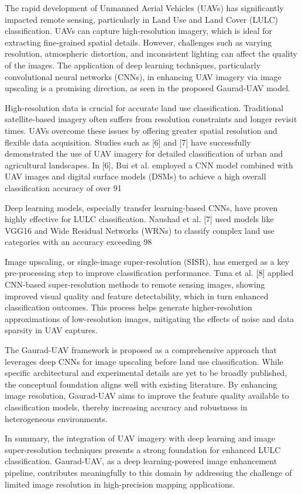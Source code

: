 The rapid development of Unmanned Aerial Vehicles (UAVs) has significantly impacted remote sensing, particularly in Land Use and Land Cover (LULC) classification. UAVs can capture high-resolution imagery, which is ideal for extracting fine-grained spatial details. However, challenges such as varying resolution, atmospheric distortion, and inconsistent lighting can affect the quality of the images. The application of deep learning techniques, particularly convolutional neural networks (CNNs), in enhancing UAV imagery via image upscaling is a promising direction, as seen in the proposed Gaurad-UAV model.

High-resolution data is crucial for accurate land use classification. Traditional satellite-based imagery often suffers from resolution constraints and longer revisit times. UAVs overcome these issues by offering greater spatial resolution and flexible data acquisition. Studies such as [6] and [7] have successfully demonstrated the use of UAV imagery for detailed classification of urban and agricultural landscapes. In [6], Bui et al. employed a CNN model combined with UAV images and digital surface models (DSMs) to achieve a high overall classification accuracy of over 91%

Deep learning models, especially transfer learning-based CNNs, have proven highly effective for LULC classification. Naushad et al. [7] used models like VGG16 and Wide Residual Networks (WRNs) to classify complex land use categories with an accuracy exceeding 98%

Image upscaling, or single-image super-resolution (SISR), has emerged as a key pre-processing step to improve classification performance. Tuna et al. [8] applied CNN-based super-resolution methods to remote sensing images, showing improved visual quality and feature detectability, which in turn enhanced classification outcomes. This process helps generate higher-resolution approximations of low-resolution images, mitigating the effects of noise and data sparsity in UAV captures.

The Gaurad-UAV framework is proposed as a comprehensive approach that leverages deep CNNs for image upscaling before land use classification. While specific architectural and experimental details are yet to be broadly published, the conceptual foundation aligns well with existing literature. By enhancing image resolution, Gaurad-UAV aims to improve the feature quality available to classification models, thereby increasing accuracy and robustness in heterogeneous environments.

In summary, the integration of UAV imagery with deep learning and image super-resolution techniques presents a strong foundation for enhanced LULC classification. Gaurad-UAV, as a deep learning-powered image enhancement pipeline, contributes meaningfully to this domain by addressing the challenge of limited image resolution in high-precision mapping applications.